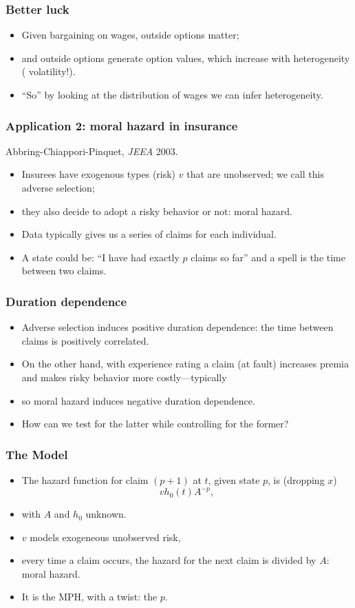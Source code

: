 \documentclass[xcolor=pdftex,dvipsnames,table,mathserif]{beamer}
\begin{document}
\begin{frame}
\frametitle{Better luck}
\begin{itemize}
\item Given bargaining on wages, outside options matter;
\item and outside options generate option values, which increase with heterogeneity ( volatility!).
\item ``So'' by looking at the distribution of wages we can infer heterogeneity.
\end{itemize}
\end{frame}


\begin{frame}
\frametitle{Application 2: moral hazard in insurance}
Abbring-Chiappori-Pinquet, {\em JEEA\/} 2003.
\begin{itemize}
\item Insurees have exogenous  types (risk) $v$ that are unobserved; we call this adverse selection;
\item they also decide to adopt a risky behavior or not: \alert{moral hazard}.
\item Data typically gives us a series of claims for each individual. 
\item A state could be: ``I have had exactly $p$ claims so far'' and a spell is the time between two claims.
\end{itemize}
\end{frame}


\begin{frame}
\frametitle{Duration dependence}
\begin{itemize}
\item Adverse selection induces positive duration dependence: the time between claims is positively correlated.
\item On the other hand, with experience rating a claim (at fault) increases premia and makes risky behavior more costly---typically
\item so moral hazard induces negative duration dependence.
\item How can we test for the latter while controlling for the former?
\end{itemize}
\end{frame}


\begin{frame}
\frametitle{The Model}
\begin{itemize}
\item The hazard function for claim $(p+1)$ at $t$, given state $p$, is (dropping $x$)
\[
v h_0(t) A^{-p},
\]
\item  with $A$ and $h_0$ unknown. 
\item $v$ models exogeneous unobserved risk, 
\item every time a claim occurs, the hazard for the next claim is divided by  $A$: moral hazard.
\item It is the MPH, with a twist: the $p$.
\end{itemize}
\end{frame}
\end{document}
